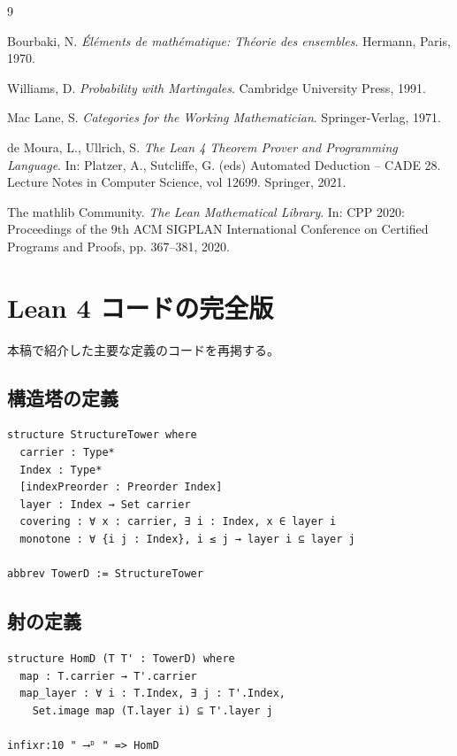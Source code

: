 \documentclass[a4paper,12pt]{ltjsarticle}
\begin{document}
\begin{thebibliography}{9}

Bourbaki, N.
\textit{Éléments de mathématique: Théorie des ensembles}.
Hermann, Paris, 1970.

Williams, D.
\textit{Probability with Martingales}.
Cambridge University Press, 1991.

Mac Lane, S.
\textit{Categories for the Working Mathematician}.
Springer-Verlag, 1971.

de Moura, L., Ullrich, S.
\textit{The Lean 4 Theorem Prover and Programming Language}.
In: Platzer, A., Sutcliffe, G. (eds) Automated Deduction -- CADE 28.
Lecture Notes in Computer Science, vol 12699. Springer, 2021.

The mathlib Community.
\textit{The Lean Mathematical Library}.
In: CPP 2020: Proceedings of the 9th ACM SIGPLAN International Conference
on Certified Programs and Proofs, pp. 367--381, 2020.

\end{thebibliography}

\appendix

\section{Lean 4 コードの完全版}

本稿で紹介した主要な定義のコードを再掲する。

\subsection{構造塔の定義}

\begin{verbatim}
structure StructureTower where
  carrier : Type*
  Index : Type*
  [indexPreorder : Preorder Index]
  layer : Index → Set carrier
  covering : ∀ x : carrier, ∃ i : Index, x ∈ layer i
  monotone : ∀ {i j : Index}, i ≤ j → layer i ⊆ layer j

abbrev TowerD := StructureTower
\end{verbatim}

\subsection{射の定義}

\begin{verbatim}
structure HomD (T T' : TowerD) where
  map : T.carrier → T'.carrier
  map_layer : ∀ i : T.Index, ∃ j : T'.Index,
    Set.image map (T.layer i) ⊆ T'.layer j

infixr:10 " ⟶ᴰ " => HomD
\end{verbatim}
\end{document}

